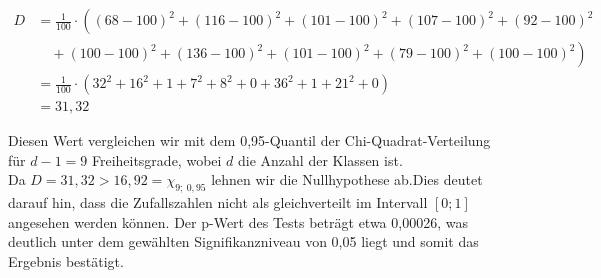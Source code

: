 \documentclass[main.tex]{subfiles}
\begin{document}
$$\begin{aligned}
	D &= \frac{1}{100} \cdot \left(
		(68 - 100)^2 +
		(116 - 100)^2 +
		(101 - 100)^2 +
		(107 - 100)^2 +
		(92 - 100)^2 \right. \\
		&\quad + \left.
		(100 - 100)^2 +
		(136 - 100)^2 +
		(101 - 100)^2 +
		(79 - 100)^2 +
		(100 - 100)^2 \right) \\
	&= \frac{1}{100} \cdot \left(
		32^2 +
		16^2 +
		1 +
		7^2 +
		8^2 +
		0 +
		36^2 +
		1 +
		21^2 +
		0
		\right)\\[2mm]
	&= 31,32
\end{aligned}$$

Diesen Wert vergleichen wir mit dem 0,95-Quantil der Chi-Quadrat-Verteilung für $d-1=9$ Freiheitsgrade, wobei $d$ die Anzahl der Klassen ist.\\

Da $D = 31,32 > 16,92 = \chi_{9;\ 0,95}$ lehnen wir die Nullhypothese ab.Dies deutet darauf hin, dass die Zufallszahlen nicht als gleichverteilt im Intervall $[0;1]$ angesehen werden können. Der p-Wert des Tests beträgt etwa 0,00026, was deutlich unter dem gewählten Signifikanzniveau von 0,05 liegt und somit das Ergebnis bestätigt.
\end{document}
